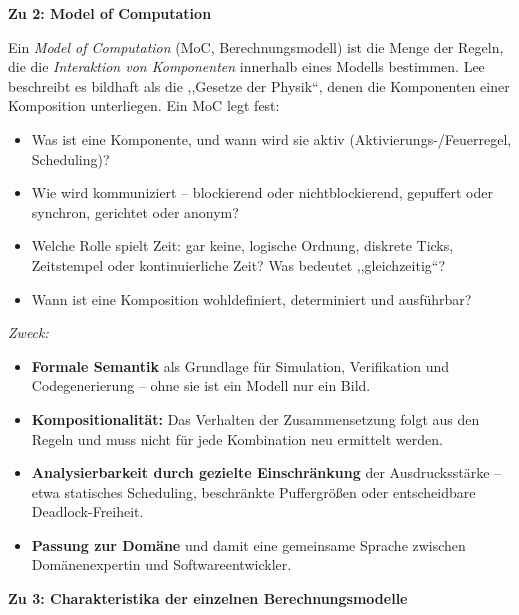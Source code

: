 \begin{loesung}
\textbf{Zu 2: Model of Computation}

Ein \emph{Model of Computation} (MoC, Berechnungsmodell) ist die Menge der Regeln, die die
\emph{Interaktion von Komponenten} innerhalb eines Modells bestimmen. Lee beschreibt es bildhaft als
die ,,Gesetze der Physik``, denen die Komponenten einer Komposition unterliegen. Ein MoC legt fest:
\begin{itemize}
    \item Was ist eine Komponente, und wann wird sie aktiv (Aktivierungs-/Feuerregel, Scheduling)?
    \item Wie wird kommuniziert -- blockierend oder nichtblockierend, gepuffert oder synchron,
          gerichtet oder anonym?
    \item Welche Rolle spielt Zeit: gar keine, logische Ordnung, diskrete Ticks, Zeitstempel oder
          kontinuierliche Zeit? Was bedeutet ,,gleichzeitig``?
    \item Wann ist eine Komposition wohldefiniert, determiniert und ausführbar?
\end{itemize}
\emph{Zweck:}
\begin{itemize}
    \item \textbf{Formale Semantik} als Grundlage für Simulation, Verifikation und Codegenerierung --
          ohne sie ist ein Modell nur ein Bild.
    \item \textbf{Kompositionalität:} Das Verhalten der Zusammensetzung folgt aus den Regeln und muss
          nicht für jede Kombination neu ermittelt werden.
    \item \textbf{Analysierbarkeit durch gezielte Einschränkung} der Ausdrucksstärke -- etwa
          statisches Scheduling, beschränkte Puffergrößen oder entscheidbare Deadlock-Freiheit.
    \item \textbf{Passung zur Domäne} und damit eine gemeinsame Sprache zwischen Domänenexpertin und
          Softwareentwickler.
\end{itemize}

\textbf{Zu 3: Charakteristika der einzelnen Berechnungsmodelle}


\end{loesung}
